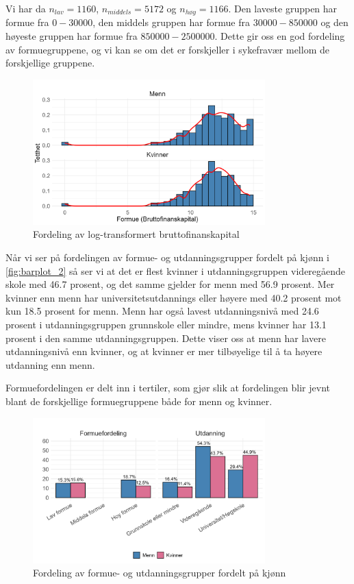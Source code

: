 \documentclass[
  12pt,
  a4paper,
  DIV=11,
  numbers=noendperiod]{scrartcl}
\begin{document}
Vi har da \(n_{lav} = 1160\), \(n_{middels} = 5172\) og
\(n_{høy} = 1166\). Den laveste gruppen har formue fra \(0 - 30000\),
den middels gruppen har formue fra \(30000 - 850000\) og den høyeste
gruppen har formue fra \(850000 - 2500000\). Dette gir oss en god
fordeling av formuegruppene, og vi kan se om det er forskjeller i
sykefravær mellom de forskjellige gruppene.

\begin{figure}[H]
\caption{Fordeling av log-transformert bruttofinanskapital}
\label{fig:histogram_formue}
\centering
\includegraphics[width=0.8\textwidth]{dokumentobjekter/figurer/fig_4.png}
\end{figure}

Når vi ser på fordelingen av formue- og utdanningsgrupper fordelt på
kjønn i \autoref{fig:barplot_2} så ser vi at det er flest kvinner i
utdanningsgruppen videregående skole med 46.7 prosent, og det samme
gjelder for menn med 56.9 prosent. Mer kvinner enn menn har
universitetsutdannings eller høyere med 40.2 prosent mot kun 18.5
prosent for menn. Menn har også lavest utdanningsnivå med 24.6 prosent i
utdanningsgruppen grunnskole eller mindre, mens kvinner har 13.1 prosent
i den samme utdanningsgruppen. Dette viser oss at menn har lavere
utdanningsnivå enn kvinner, og at kvinner er mer tilbøyelige til å ta
høyere utdanning enn menn.

Formuefordelingen er delt inn i tertiler, som gjør slik at fordelingen
blir jevnt blant de forskjellige formuegruppene både for menn og
kvinner.

\begin{figure}[H]
\caption{Fordeling av formue- og utdanningsgrupper fordelt på kjønn}
\label{fig:barplot_2}
\centering
\includegraphics[width=0.8\textwidth]{dokumentobjekter/figurer/fig_5.png}
\end{figure}
\end{document}
